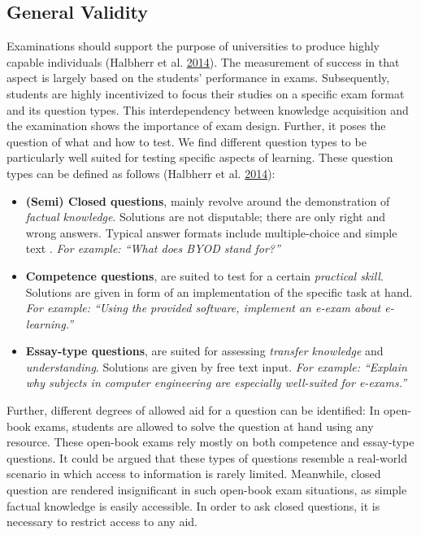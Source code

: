 \hypertarget{general-validity}{%
\subsection{General Validity}\label{general-validity}}

Examinations should support the purpose of universities to produce
highly capable individuals (Halbherr et al.
\protect\hyperlink{ref-Halbherr2014}{2014}). The measurement of success
in that aspect is largely based on the students' performance in exams.
Subsequently, students are highly incentivized to focus their studies on
a specific exam format and its question types. This interdependency
between knowledge acquisition and the examination shows the importance
of exam design. Further, it poses the question of what and how to test.
We find different question types to be particularly well suited for
testing specific aspects of learning. These question types can be
defined as follows (Halbherr et al.
\protect\hyperlink{ref-Halbherr2014}{2014}):

\begin{itemize}
\tightlist
\item
  \textbf{(Semi) Closed questions}, mainly revolve around the
  demonstration of \emph{factual knowledge}. Solutions are not
  disputable; there are only right and wrong answers. Typical answer
  formats include multiple-choice and simple text . \emph{For example:
  ``What does \emph{BYOD} stand for?''}
\item
  \textbf{Competence questions}, are suited to test for a certain
  \emph{practical skill}. Solutions are given in form of an
  implementation of the specific task at hand. \emph{For example:
  ``Using the provided software, implement an e-exam about
  e-learning.''}
\item
  \textbf{Essay-type questions}, are suited for assessing \emph{transfer
  knowledge} and \emph{understanding}. Solutions are given by free text
  input. \emph{For example: ``Explain why subjects in computer
  engineering are especially well-suited for e-exams.''}
\end{itemize}

Further, different degrees of allowed aid for a question can be
identified: In open-book exams, students are allowed to solve the
question at hand using any resource. These open-book exams rely mostly
on both competence and essay-type questions. It could be argued that
these types of questions resemble a real-world scenario in which access
to information is rarely limited. Meanwhile, closed question are
rendered insignificant in such open-book exam situations, as simple
factual knowledge is easily accessible. In order to ask closed
questions, it is necessary to restrict access to any aid.

